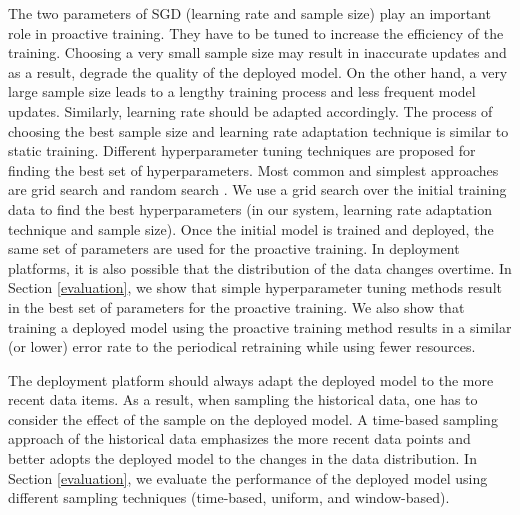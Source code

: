 The two parameters of SGD (learning rate and sample size) play an important role in proactive training.
They have to be tuned to increase the efficiency of the training.
Choosing  a very small sample size may result in inaccurate updates and as a result, degrade the quality of the deployed model.
On the other hand, a very large sample size leads to a lengthy training process and less frequent model updates.
Similarly, learning rate should be adapted accordingly.
The process of choosing the best sample size and learning rate adaptation technique is similar to static training.
Different hyperparameter tuning techniques are proposed for finding the best set of hyperparameters.
Most common and simplest approaches are grid search and random search \cite{bergstra2012random}.
We use a grid search over the initial training data to find the best hyperparameters (in our system, learning rate adaptation technique and sample size).
Once the initial model is trained and deployed, the same set of parameters are used for the proactive training.
In deployment platforms, it is also possible that the distribution of the data changes overtime.
In Section \ref{evaluation}, we show that simple hyperparameter tuning methods result in the best set of parameters for the proactive training.
We also show that training a deployed model using the proactive training method results in a similar (or lower) error rate to the periodical retraining while using fewer resources.

The deployment platform should always adapt the deployed model to the more recent data items.
As a result, when sampling the historical data, one has to consider the effect of the sample on the deployed model.
A time-based sampling approach of the historical data emphasizes the more recent data points and better adopts the deployed model to the changes in the data distribution.
In Section \ref{evaluation}, we evaluate the performance of the deployed model using different sampling techniques (time-based, uniform, and window-based).


